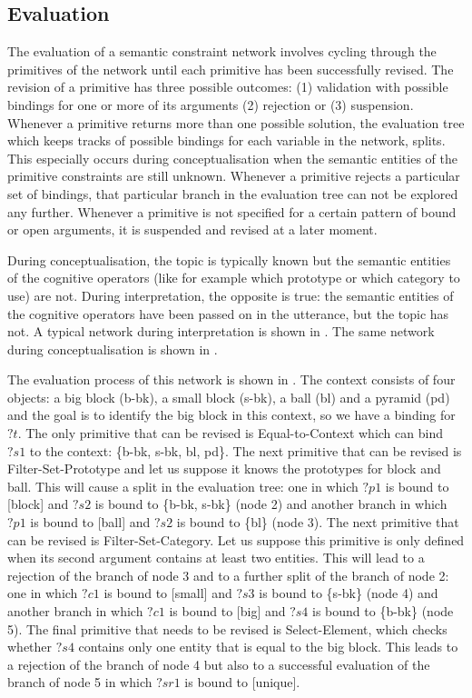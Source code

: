 \subsection{Evaluation}

The evaluation of a semantic constraint network involves cycling
through the primitives of the network until each primitive has been
successfully revised. The revision of a primitive has three possible
outcomes: (1) validation with possible bindings for one or more of its
arguments (2) rejection or (3) suspension. Whenever a primitive
returns more than one possible solution, the evaluation tree which
keeps tracks of possible bindings for each variable in the network,
splits. This especially occurs during conceptualisation when the
semantic entities of the primitive constraints are still
unknown. Whenever a primitive rejects a particular set of bindings,
that particular branch in the evaluation tree can not be explored any
further. Whenever a primitive is not specified for a certain pattern \enlargethispage{\baselineskip}
of bound or open arguments, it is suspended and revised at a later
moment.

During conceptualisation, the topic is typically known but the
semantic entities of the cognitive operators (like for example which
prototype or which category to use) are not. During interpretation,
the opposite is true: the semantic entities of the cognitive operators
have been passed on in the utterance, but the topic has not. A typical
network during interpretation is shown in . The same network during
conceptualisation is shown in .

The evaluation process of this network is shown in . The context consists of four objects: a
big block (b-bk), a small block (s-bk), a ball (bl) and a pyramid (pd)
and the goal is to identify the big block in this context, so we have
a binding for $?t$. The only primitive that can be revised is {\sc
  Equal-to-Context} which can bind $?s1$ to the context: \{b-bk, s-bk,
bl, pd\}. The next primitive that can be revised is {\sc
  Filter-Set-Prototype} and let us suppose it knows the prototypes for
block and ball. This will cause a split in the evaluation tree: one in
which $?p1$ is bound to [block] and $?s2$ is bound to \{b-bk, s-bk\}
(node 2) and another branch in which $?p1$ is bound to [ball] and
$?s2$ is bound to \{bl\} (node 3). The next primitive that can be
revised is {\sc Filter-Set-Category}. Let us suppose this primitive is
only defined when its second argument contains at least two
entities. This will lead to a rejection of the branch of node 3 and to
a further split of the branch of node 2: one in which $?c1$ is bound
to [small] and $?s3$ is bound to \{s-bk\} (node 4) and another branch
in which $?c1$ is bound to [big] and $?s4$ is bound to \{b-bk\} (node
5). The final primitive that needs to be revised is {\sc
  Select-Element}, which checks whether $?s4$ contains only one entity
that is equal to the big block. This leads to a rejection of the
branch of node 4 but also to a successful evaluation of the branch of
node 5 in which $?sr1$ is bound to [unique].

